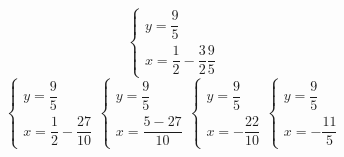 \begin{exercise}{}
\[	\begin{cases}
		y=\dfrac{9}{5}\\
		x=\dfrac{1}{2}-\dfrac{3}{2}\dfrac{9}{5}
	\end{cases}
	\]
	\[
	\begin{cases}
		y=\dfrac{9}{5}\\
			x=\dfrac{1}{2}-\dfrac{27}{10}
	\end{cases}
	\begin{cases}
			y=\dfrac{9}{5}\\
		x=\dfrac{5-27}{10}
	\end{cases}
\begin{cases}
	y=\dfrac{9}{5}\\
	x=-\dfrac{22}{10}
\end{cases}
\begin{cases}
	y=\dfrac{9}{5}\\
	x=-\dfrac{11}{5}
\end{cases}
	\]
\end{exercise}
